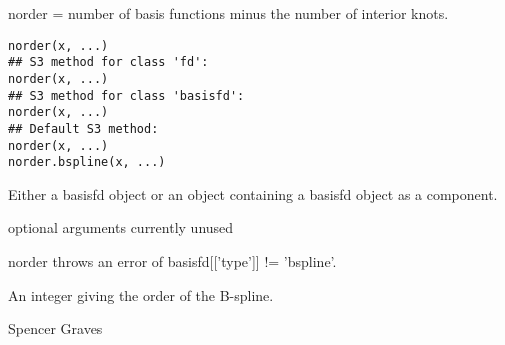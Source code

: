 \begin{Description}\relax
norder = number of basis functions minus the number of interior
knots.
\end{Description}
\begin{Usage}
\begin{verbatim}
norder(x, ...) 
## S3 method for class 'fd':
norder(x, ...)
## S3 method for class 'basisfd':
norder(x, ...)
## Default S3 method:
norder(x, ...)
norder.bspline(x, ...) 
\end{verbatim}
\end{Usage}
\begin{Arguments}
\begin{ldescription}
\item[\code{x}] Either a basisfd object or an object containing a basisfd object as
a component.  

\item[\code{...}] optional arguments currently unused
\end{ldescription}
\end{Arguments}
\begin{Details}\relax
norder throws an error of basisfd[['type']] != 'bspline'.
\end{Details}
\begin{Value}
An integer giving the order of the B-spline.
\end{Value}
\begin{Author}\relax
Spencer Graves
\end{Author}
\begin{SeeAlso}\relax
{}
\end{SeeAlso}
